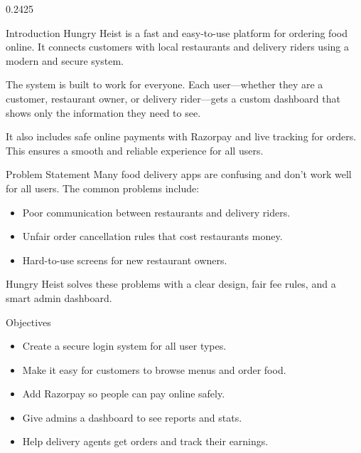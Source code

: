 \documentclass[final]{beamer}
\begin{document}
\begin{frame}[t]

\begin{columns}[t,totalwidth=\textwidth]

\begin{column}{0.2425\textwidth}

\begin{posterbox}{Introduction}
Hungry Heist is a fast and easy-to-use platform for ordering food online. It connects customers with local restaurants and delivery riders using a modern and secure system.

\vspace{0.3cm}
The system is built to work for everyone. Each user—whether they are a customer, restaurant owner, or delivery rider—gets a custom dashboard that shows only the information they need to see.

\vspace{0.3cm}
It also includes safe online payments with Razorpay and live tracking for orders. This ensures a smooth and reliable experience for all users.
\end{posterbox}

\vfill

\begin{posterbox}{Problem Statement}
Many food delivery apps are confusing and don't work well for all users. The common problems include:
\begin{itemize}[leftmargin=1.2em, itemsep=0.1cm, label=\textbullet]
  \item Poor communication between restaurants and delivery riders.
  \item Unfair order cancellation rules that cost restaurants money.
  \item Hard-to-use screens for new restaurant owners.
\end{itemize}
\vspace{0.2cm}
Hungry Heist solves these problems with a clear design, fair fee rules, and a smart admin dashboard.
\end{posterbox}

\vfill

\begin{posterbox}{Objectives}
\begin{itemize}[leftmargin=1.2em, itemsep=0.15cm,label=\textbullet]
  \item Create a secure login system for all user types.
  \item Make it easy for customers to browse menus and order food.
  \item Add Razorpay so people can pay online safely.
  \item Give admins a dashboard to see reports and stats.
  \item Help delivery agents get orders and track their earnings.
\end{itemize}
\end{posterbox}


\end{column}
\end{columns}
\end{frame}
\end{document}
